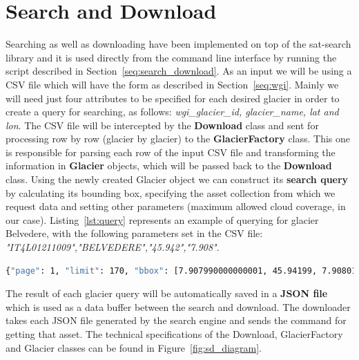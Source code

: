\documentclass[11pt, a4paper]{report}
\begin{document}
	\section{Search and Download}
	
	Searching as well as downloading have been implemented on top of the sat-search library and it is used directly from the command line interface by running the script described in Section~\ref{seq:search_download}.
	As an input we will be using a CSV file which will have the form as described in Section~\ref{seq:wgi}. Mainly we will need just four attributes to be specified for each desired glacier in order to create a query for searching, as follows: \textit{wgi\_glacier\_id, glacier\_name, lat and lon}.
	The CSV file will be intercepted by the \textbf{Download } class and sent for processing row by row (glacier by glacier) to the \textbf{GlacierFactory} class. This one is responsible for parsing each row of the input CSV file and transforming the information in \textbf{Glacier} objects, which will be passed back to the \textbf{Download} class.
	Using the newly created Glacier object we can construct its \textbf{search query} by calculating its bounding box, specifying the asset collection from which we request data and setting other parameters (maximum allowed cloud coverage, in our case). Listing~\ref{lst:query} represents an example of querying for glacier Belvedere, with the following parameters set in the CSV file: \textit{"IT4L01211009","BELVEDERE","45.942","7.908"}.
	\begin{lstlisting}[caption={Search query created by sat-search},label={lst:query},language=Bash]
		{"page": 1, "limit": 170, "bbox": [7.907990000000001, 45.94199, 7.90801, 45.94201], "query": {"eo:cloud_cover": {"lt": 10}}, "collection": "landsat-8-l1"}
	\end{lstlisting}
	The result of each glacier query will be automatically saved in a \textbf{JSON file} which is used as a data buffer between the search and download. The downloader takes each JSON file generated by the search engine and sends the command for getting that asset.
	The technical specifications of the Download, GlacierFactory and Glacier classes can be found in Figure~\ref{fig:sd_diagram}.
	\label{seq:sd_implementation}
\end{document}
